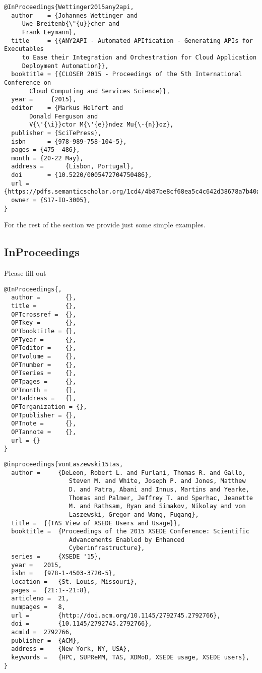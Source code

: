 \begin{verbatim}
@InProceedings{Wettinger2015any2api,    
  author    = {Johannes Wettinger and
     Uwe Breitenb{\"{u}}cher and
     Frank Leymann},
  title     = {{ANY2API - Automated APIfication - Generating APIs for Executables
     to Ease their Integration and Orchestration for Cloud Application
     Deployment Automation}},
  booktitle = {{CLOSER 2015 - Proceedings of the 5th International Conference on
       Cloud Computing and Services Science}},
  year =     {2015},
  editor    = {Markus Helfert and
       Donald Ferguson and
       V{\'{\i}}ctor M{\'{e}}ndez Mu{\-{n}}oz},
  publisher = {SciTePress},
  isbn      = {978-989-758-104-5},
  pages = {475--486},
  month = {20-22 May},
  address =      {Lisbon, Portugal},
  doi       = {10.5220/0005472704750486},
  url ={https://pdfs.semanticscholar.org/1cd4/4b87be8cf68ea5c4c642d38678a7b40a86de.pdf},
  owner = {S17-IO-3005},
}
\end{verbatim}


For the rest of the section we provide just some simple examples.

\subsection{InProceedings}\label{s:e:inproceedings}

Please fill out

\begin{verbatim}
@InProceedings{,
  author =       {},
  title =        {},
  OPTcrossref =  {},
  OPTkey =       {},
  OPTbooktitle = {},
  OPTyear =      {},
  OPTeditor =    {},
  OPTvolume =    {},
  OPTnumber =    {},
  OPTseries =    {},
  OPTpages =     {},
  OPTmonth =     {},
  OPTaddress =   {},
  OPTorganization = {},
  OPTpublisher = {},
  OPTnote =      {},
  OPTannote =    {},
  url = {}
}
\end{verbatim}

\begin{verbatim}
@inproceedings{vonLaszewski15tas,
  author =     {DeLeon, Robert L. and Furlani, Thomas R. and Gallo,
                  Steven M. and White, Joseph P. and Jones, Matthew
                  D. and Patra, Abani and Innus, Martins and Yearke,
                  Thomas and Palmer, Jeffrey T. and Sperhac, Jeanette
                  M. and Rathsam, Ryan and Simakov, Nikolay and von
                  Laszewski, Gregor and Wang, Fugang},
  title =  {{TAS View of XSEDE Users and Usage}},
  booktitle =  {Proceedings of the 2015 XSEDE Conference: Scientific
                  Advancements Enabled by Enhanced
                  Cyberinfrastructure},
  series =     {XSEDE '15},
  year =   2015,
  isbn =   {978-1-4503-3720-5},
  location =   {St. Louis, Missouri},
  pages =  {21:1--21:8},
  articleno =  21,
  numpages =   8,
  url =        {http://doi.acm.org/10.1145/2792745.2792766},
  doi =        {10.1145/2792745.2792766},
  acmid =  2792766,
  publisher =  {ACM},
  address =    {New York, NY, USA},
  keywords =   {HPC, SUPReMM, TAS, XDMoD, XSEDE usage, XSEDE users},
}
\end{verbatim}

